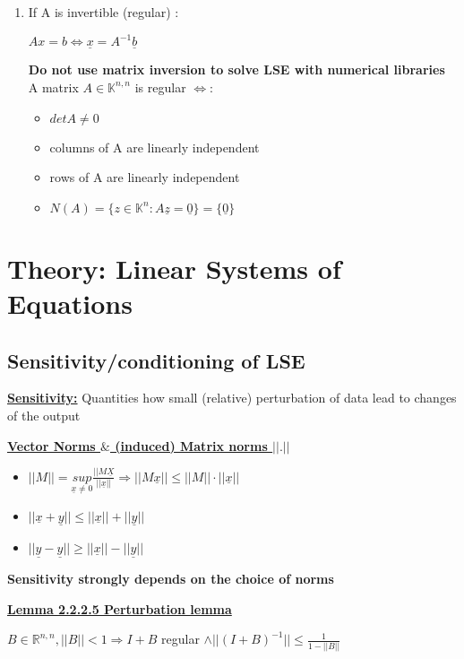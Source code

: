 \documentclass[8pt]{extreport}
\begin{document}
\begin{enumerate}
\item If A is invertible (regular) :
\begin{center}
$ Ax = b \iff \underline{x} = A^{-1}\underline{b}$
\end{center}
\textbf{Do not use matrix inversion to solve LSE with numerical libraries}\\
A matrix $A \in \mathbb{K}^{n,n}$ is regular $\iff$:
\begin{itemize}
\item $detA \neq 0$
\item columns of A are linearly independent
\item rows of A are linearly independent
\item $N(A) = \{z \in \mathbb{K}^{n}: A\underline{z} = \underline{0}\} = \{\underline{0}\}$
\end{itemize}
\end{enumerate}


\section{Theory: Linear Systems of Equations}

\subsection{ Sensitivity/conditioning of LSE}

\underline{\textbf{Sensitivity:}} Quantities how small (relative) perturbation of data lead to changes of the output

\underline{\textbf{Vector Norms $\&$ (induced) Matrix norms $|| . ||$}}
\begin{itemize}
\item $||M|| = \underset{\underline{x} \neq 0}{sup} \frac{||M\underline{X}}{||\underline{x}||} \Rightarrow ||M\underline{x}|| \leq ||M||\cdot||\underline{x}||$
\item $||\underline{x} + \underline{y}|| \leq ||\underline{x}||+ ||\underline{y}||$
\item $||\underline{y} - \underline{y}|| \geq ||\underline{x}|| - ||\underline{y}||$
\end{itemize}

\textbf{Sensitivity strongly depends on the choice of norms}

\underline{\textbf{Lemma 2.2.2.5 Perturbation lemma}}
\begin{center}
$B \in \mathbb{R}^{n,n}, ||B|| < 1 \Rightarrow I + B$ regular $\wedge ||(I+B)^{-1}|| \leq \frac{1}{1-||B||}$
\end{center}
\end{document}
